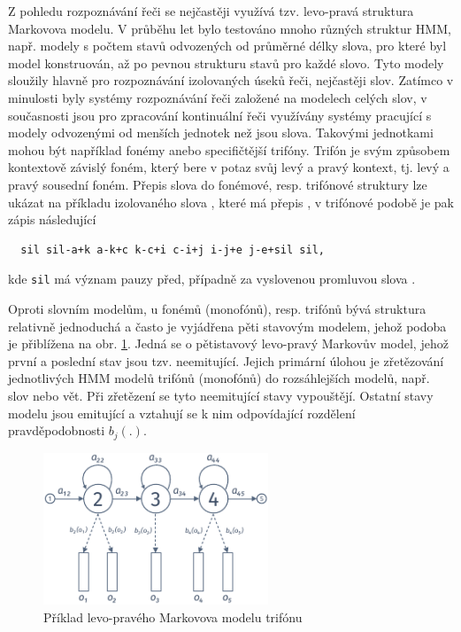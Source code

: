 Z pohledu rozpoznávání řeči se nejčastěji využívá tzv. levo-pravá struktura Markovova modelu. V průběhu let bylo testováno mnoho různých struktur HMM, např. modely s počtem stavů odvozených od průměrné délky slova, pro které byl model konstruován, až po pevnou strukturu stavů pro každé slovo. Tyto modely sloužily hlavně pro rozpoznávání izolovaných úseků řeči, nejčastěji slov.
Zatímco v minulosti byly systémy rozpoznávání řeči založené na modelech celých slov, v současnosti jsou pro zpracování kontinuální řeči využívány systémy pracující s modely odvozenými od menších jednotek než jsou slova.
Takovými jednotkami mohou být například fonémy anebo specifičtější trifóny. Trifón je svým způsobem kontextově závislý foném, který bere v potaz svůj levý a pravý kontext, tj. levý a pravý sousední foném. Přepis slova do fonémové, resp. trifónové struktury lze ukázat na příkladu izolovaného slova , které má přepis , v trifónové podobě je pak zápis následující

\begin{verbatim}
  sil sil-a+k a-k+c k-c+i c-i+j i-j+e j-e+sil sil,
\end{verbatim}

\noindent kde \texttt{sil} má význam pauzy před, případně za vyslovenou promluvou slova .

Oproti slovním modelům, u fonémů (monofónů), resp. trifónů bývá struktura relativně jednoduchá a často je vyjádřena pěti stavovým modelem, jehož podoba je přiblížena na obr. \ref{fig:asr:acoustic:hmm}. Jedná se o pětistavový levo-pravý Markovův model, jehož první a poslední stav jsou tzv. neemitující. Jejich primární úlohou je zřetězování jednotlivých HMM modelů trifónů (monofónů) do rozsáhlejších modelů, např. slov nebo vět. Při zřetězení se tyto neemitující stavy vypouštějí. Ostatní stavy modelu jsou emitující a vztahují se k nim odpovídající rozdělení pravděpodobnosti $b_j(.)$.

\begin{figure}[hbpt]
  \centering
  \includegraphics[width=0.6\textwidth]{./ch4-asr/img/hmm_structure.pdf}
  \caption{Příklad levo-pravého Markovova modelu trifónu}
  \label{fig:asr:acoustic:hmm}
\end{figure}

